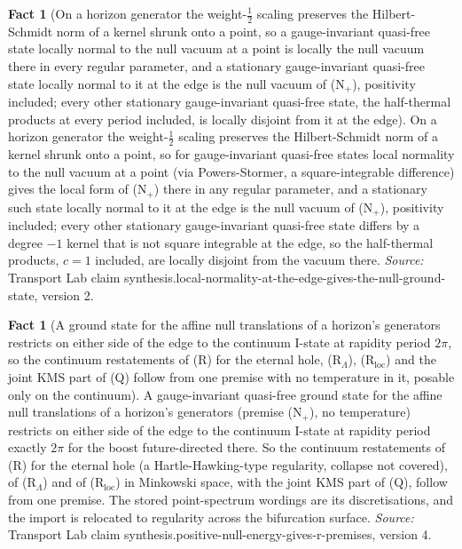 \documentclass[11pt]{article}
\theoremstyle{definition}
\newtheorem{fact}[theorem]{Fact}
\theoremstyle{plain}
\begin{document}
\begin{fact}[On a horizon generator the weight-$\tfrac12$ scaling preserves the Hilbert-Schmidt norm of a kernel shrunk onto a point, so a gauge-invariant quasi-free state locally normal to the null vacuum at a point is locally the null vacuum there in every regular parameter, and a stationary gauge-invariant quasi-free state locally normal to it at the edge is the null vacuum of (N$_{+}$), positivity included; every other stationary gauge-invariant quasi-free state, the half-thermal products at every period included, is locally disjoint from it at the edge]\label{c:synthesis.local-normality-at-the-edge-gives-the-null-ground-state}
On a horizon generator the weight-$\tfrac12$ scaling preserves the Hilbert-Schmidt norm of a kernel shrunk onto a point, so for gauge-invariant quasi-free states local normality to the null vacuum at a point (via Powers-Stormer, a square-integrable difference) gives the local form of (N$_{+}$) there in any regular parameter, and a stationary such state locally normal to it at the edge is the null vacuum of (N$_{+}$), positivity included; every other stationary gauge-invariant quasi-free state differs by a degree $-1$ kernel that is not square integrable at the edge, so the half-thermal products, $c = 1$ included, are locally disjoint from the vacuum there.
\emph{Source:} Transport Lab claim synthesis.local-normality-at-the-edge-gives-the-null-ground-state, version 2.
\end{fact}

\begin{fact}[A ground state for the affine null translations of a horizon's generators restricts on either side of the edge to the continuum I-state at rapidity period $2\pi$, so the continuum restatements of (R) for the eternal hole, (R$_{\Lambda}$), (R$_{\mathrm{loc}}$) and the joint KMS part of (Q) follow from one premise with no temperature in it, posable only on the continuum]\label{c:synthesis.positive-null-energy-gives-r-premises}
A gauge-invariant quasi-free ground state for the affine null translations of a horizon's generators (premise (N$_{+}$), no temperature) restricts on either side of the edge to the continuum I-state at rapidity period exactly $2\pi$ for the boost future-directed there. So the continuum restatements of (R) for the eternal hole (a Hartle-Hawking-type regularity, collapse not covered), of (R$_{\Lambda}$) and of (R$_{\mathrm{loc}}$) in Minkowski space, with the joint KMS part of (Q), follow from one premise. The stored point-spectrum wordings are its discretisations, and the import is relocated to regularity across the bifurcation surface.
\emph{Source:} Transport Lab claim synthesis.positive-null-energy-gives-r-premises, version 4.
\end{fact}
\end{document}
